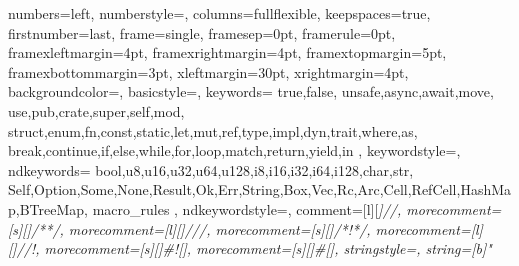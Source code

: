 \usepackage[style=english]{csquotes} %

\usepackage{tocloft,calc}
\renewcommand{\cftlottitlefont}{\hspace*{\fill}\large}
\renewcommand{\cftafterlottitle}{\hspace*{\fill}}
\renewcommand{\cftloftitlefont}{\hspace*{\fill}\large}
\renewcommand{\cftafterloftitle}{\hspace*{\fill}}
\renewcommand{\cftchapaftersnum}{:\ }
\renewcommand{\cftchappresnum}{\chaptername\space}
\makeatletter
\g@addto@macro\appendix{%
  \addtocontents{toc}{%
    \protect\renewcommand{\protect\cftchappresnum}{\appendixname\space}%
  }%
}
\setlength{\cftchapnumwidth}{9em} %


\usepackage{color}
\usepackage{listings}
{
	numbers=left,
	numberstyle=\small\ttfamily\color{GrayComment},
    columns=fullflexible,
    keepspaces=true,
	firstnumber=last,
    frame=single,
    framesep=0pt,
    framerule=0pt,
    framexleftmargin=4pt,
    framexrightmargin=4pt,
    framextopmargin=5pt,
    framexbottommargin=3pt,
    xleftmargin=30pt, %
    xrightmargin=4pt,
    backgroundcolor=\color{GrayCodeBlock},
    basicstyle=\small\ttfamily\color{BlackText},
    keywords={
        true,false,
        unsafe,async,await,move,
        use,pub,crate,super,self,mod,
        struct,enum,fn,const,static,let,mut,ref,type,impl,dyn,trait,where,as,
        break,continue,if,else,while,for,loop,match,return,yield,in
    },
    keywordstyle=\color{PurpleKeyword},
    ndkeywords={
        bool,u8,u16,u32,u64,u128,i8,i16,i32,i64,i128,char,str,
        Self,Option,Some,None,Result,Ok,Err,String,Box,Vec,Rc,Arc,Cell,RefCell,HashMap,BTreeMap,
        macro_rules
    },
    ndkeywordstyle=\color{RedTypename},
    comment=[l][\color{GrayComment}\slshape]{//},
    morecomment=[s][\color{GrayComment}\slshape]{/*}{*/},
    morecomment=[l][\color{GoldDocumentation}\slshape]{///},
    morecomment=[s][\color{GoldDocumentation}\slshape]{/*!}{*/},
    morecomment=[l][\color{GoldDocumentation}\slshape]{//!},
    morecomment=[s][\color{RedTypename}]{\#![}{]},
    morecomment=[s][\color{RedTypename}]{\#[}{]},
    stringstyle=\color{GreenString},
    string=[b]"
}

